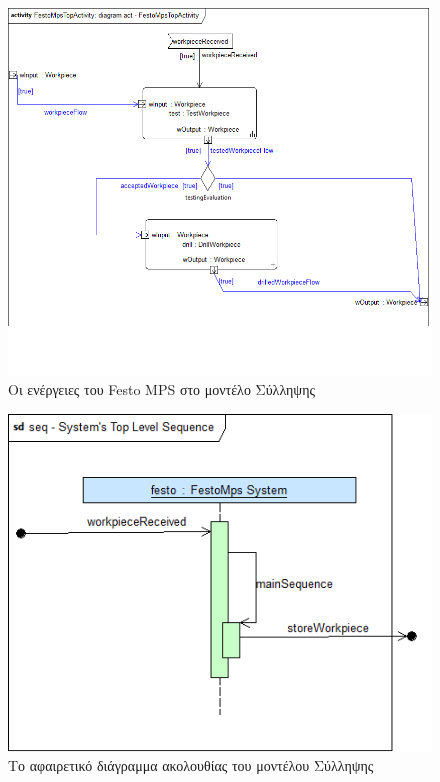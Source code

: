 \documentclass[a4paper,12pt,twoside]{report}
\begin{document}
{\begin{appendices}
				\begin{figure}[hp]
					\centering
					\includegraphics[scale=0.45]{ConceptionalModel_act-SystemsTopLevelActivity.png}
					\caption{Οι ενέργειες του Festo MPS στο μοντέλο Σύλληψης}
					\label{φωτ:Οι ενέργειες του Festo MPS στο μοντέλο Σύλληψης}
				\end{figure}
				\begin{figure}[hp]
					\centering
					\includegraphics[scale=0.45]{ConceptionalModel_seq-SystemsTopLevelSequence.png}
					\caption{Το αφαιρετικό διάγραμμα ακολουθίας του μοντέλου Σύλληψης}
					\label{φωτ:Το αφαιρετικό διάγραμμα ακολουθίας του μοντέλου Σύλληψης}

\end{figure}
\end{appendices}}
\end{document}
